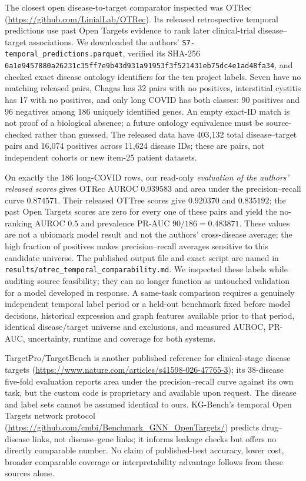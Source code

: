 \documentclass[11pt,a4paper]{article}
\begin{document}
The closest open disease-to-target comparator inspected was OTRec (\url{https://github.com/LinialLab/OTRec}). Its released retrospective temporal predictions use past Open Targets evidence to rank later clinical-trial disease--target associations. We downloaded the authors' \texttt{S7-temporal\_predictions.parquet}, verified its SHA-256 \texttt{6a1e9457880a26231c35ff7e9b43d931a91953f3f521431eb75dc4e1ad48fa34}, and checked exact disease ontology identifiers for the ten project labels. Seven have no matching released pairs, Chagas has 32 pairs with no positives, interstitial cystitis has 17 with no positives, and only long COVID has both classes: 90 positives and 96 negatives among 186 uniquely identified genes. An empty exact-ID match is not proof of a biological absence; a future ontology equivalence must be source-checked rather than guessed. The released data have 403,132 total disease--target pairs and 16,074 positives across 11,624 disease IDs; these are pairs, not independent cohorts or new item-25 patient datasets.

On exactly the 186 long-COVID rows, our read-only \emph{evaluation of the authors' released scores} gives OTRec AUROC $0.939583$ and area under the precision--recall curve $0.874571$. Their released OTTree scores give $0.920370$ and $0.835192$; the past Open Targets scores are zero for every one of these pairs and yield the no-ranking AUROC $0.5$ and prevalence PR-AUC $90/186=0.483871$. These values are not a ubiomark model result and not the authors' cross-disease average; the high fraction of positives makes precision--recall averages sensitive to this candidate universe. The published output file and exact script are named in \texttt{results/otrec\_temporal\_comparability.md}. We inspected these labels while auditing source feasibility; they can no longer function as untouched validation for a model developed in response. A same-task comparison requires a genuinely independent temporal label period or a held-out benchmark fixed before model decisions, historical expression and graph features available prior to that period, identical disease/target universe and exclusions, and measured AUROC, PR-AUC, uncertainty, runtime and coverage for both systems.

TargetPro/TargetBench is another published reference for clinical-stage disease targets (\url{https://www.nature.com/articles/s41598-026-47765-3}); its 38-disease five-fold evaluation reports area under the precision--recall curve against its own task, but the custom code is proprietary and available upon request. The disease and label sets cannot be assumed identical to ours. KG-Bench's temporal Open Targets network protocol (\url{https://github.com/cmbi/Benchmark_GNN_OpenTargets/}) predicts drug--disease links, not disease--gene links; it informs leakage checks but offers no directly comparable number. No claim of published-best accuracy, lower cost, broader comparable coverage or interpretability advantage follows from these sources alone.
\end{document}

